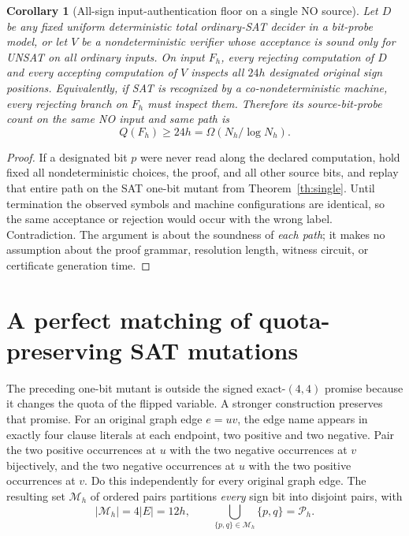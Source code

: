 \documentclass[11pt]{article}
\newtheorem{corollary}[theorem]{Corollary}
\begin{document}
\begin{corollary}[All-sign input-authentication floor on a single NO source]\label{cor:source}
Let $D$ be any fixed uniform deterministic total ordinary-SAT decider in a bit-probe model, or let $V$ be a nondeterministic verifier whose acceptance is sound only for UNSAT \emph{on all ordinary inputs}. On input $F_h$, every rejecting computation of $D$ and every accepting computation of $V$ inspects all $24h$ designated original sign positions. Equivalently, if SAT is recognized by a co-nondeterministic machine, every rejecting branch on $F_h$ must inspect them. Therefore its source-bit-probe count on the \emph{same NO input and same path} is
\[
                         Q(F_h)\ge24h=\Omega(N_h/\log N_h).\tag{3}
\]
\end{corollary}
\begin{proof}
If a designated bit $p$ were never read along the declared computation, hold fixed all nondeterministic choices, the proof, and all other source bits, and replay that entire path on the SAT one-bit mutant from Theorem~\ref{th:single}. Until termination the observed symbols and machine configurations are identical, so the same acceptance or rejection would occur with the wrong label. Contradiction. The argument is about the soundness of \emph{each path}; it makes no assumption about the proof grammar, resolution length, witness circuit, or certificate generation time.\end{proof}

\section{A perfect matching of quota-preserving SAT mutations}
The preceding one-bit mutant is outside the signed exact-$(4,4)$ promise because it changes the quota of the flipped variable. A stronger construction preserves that promise. For an original graph edge $e=uv$, the edge name appears in exactly four clause literals at each endpoint, two positive and two negative. Pair the two positive occurrences at $u$ with the two negative occurrences at $v$ bijectively, and the two negative occurrences at $u$ with the two positive occurrences at $v$. Do this independently for every original graph edge. The resulting set $\mathcal M_h$ of ordered pairs partitions \emph{every} sign bit into disjoint pairs, with
\[
                   |\mathcal M_h|=4|E|=12h,\qquad
                   \bigcup_{\{p,q\}\in\mathcal M_h}\{p,q\}=\mathcal P_h.\tag{4}
\]
\end{document}
